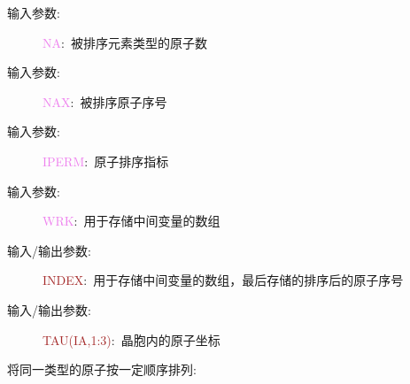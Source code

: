\documentclass{article}      %
\begin{document}
\vskip 30pt
\begin{description}
	\item[输入参数:~] \textcolor{violet}{\textrm{NA}}:~被排序元素类型的原子数
	\item[输入参数:~] \textcolor{violet}{\textrm{NAX}}:~被排序原子序号
	\item[输入参数:~] \textcolor{violet}{\textrm{IPERM}}:~原子排序指标
	\item[输入参数:~] \textcolor{violet}{\textrm{WRK}}:~用于存储中间变量的数组
	\item[输入/输出参数:~] \textcolor{brown}{\textrm{INDEX}}:~用于存储中间变量的数组，最后存储的排序后的原子序号
	\item[输入/输出参数:~] \textcolor{brown}{\textrm{TAU}(IA,1:3)}:~晶胞内的原子坐标
\end{description}
将同一类型的原子按一定顺序排列:
\end{document}
